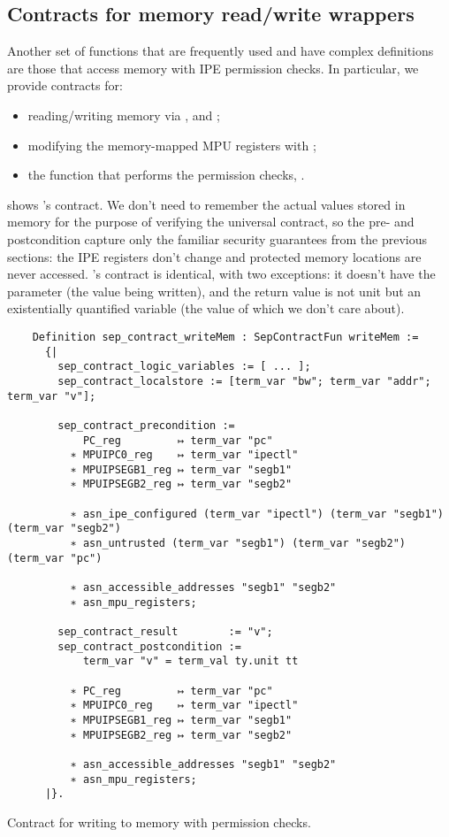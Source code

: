 \subsection{Contracts for memory read/write wrappers}

Another set of functions that are frequently used and have complex definitions are those that access memory with IPE permission checks. In particular, we provide contracts for:
\begin{itemize}
\item reading/writing memory via ,  and ;
\item modifying the memory-mapped MPU registers with ;
\item the function that performs the permission checks, .
\end{itemize}

 shows 's contract. We don't need to remember the actual values stored in memory for the purpose of verifying the universal contract, so the pre- and postcondition capture only the familiar security guarantees from the previous sections: the IPE registers don't change and protected memory locations are never accessed. 's contract is identical, with two exceptions: it doesn't have the  parameter (the value being written), and the return value is not unit but an existentially quantified variable (the value of which we don't care about).

\begin{listing}
  \begin{verbatim}
    Definition sep_contract_writeMem : SepContractFun writeMem :=
      {|
        sep_contract_logic_variables := [ ... ];
        sep_contract_localstore := [term_var "bw"; term_var "addr"; term_var "v"];

        sep_contract_precondition :=
            PC_reg         ↦ term_var "pc"
          ∗ MPUIPC0_reg    ↦ term_var "ipectl"
          ∗ MPUIPSEGB1_reg ↦ term_var "segb1"
          ∗ MPUIPSEGB2_reg ↦ term_var "segb2"

          ∗ asn_ipe_configured (term_var "ipectl") (term_var "segb1") (term_var "segb2")
          ∗ asn_untrusted (term_var "segb1") (term_var "segb2") (term_var "pc")

          ∗ asn_accessible_addresses "segb1" "segb2"
          ∗ asn_mpu_registers;

        sep_contract_result        := "v";
        sep_contract_postcondition :=
            term_var "v" = term_val ty.unit tt

          ∗ PC_reg         ↦ term_var "pc"
          ∗ MPUIPC0_reg    ↦ term_var "ipectl"
          ∗ MPUIPSEGB1_reg ↦ term_var "segb1"
          ∗ MPUIPSEGB2_reg ↦ term_var "segb2"

          ∗ asn_accessible_addresses "segb1" "segb2"
          ∗ asn_mpu_registers;
      |}.
  \end{verbatim}
  \caption{Contract for writing to memory with permission checks.}
  \label{lst:writeMem}
\end{listing}

